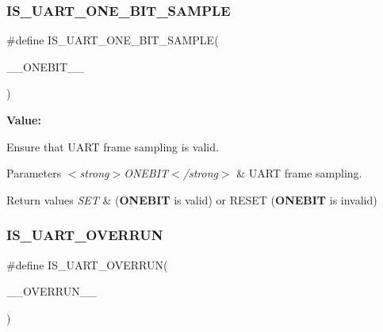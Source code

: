 \subsubsection{\texorpdfstring{IS\_UART\_ONE\_BIT\_SAMPLE}{IS\_UART\_ONE\_BIT\_SAMPLE}}
{\footnotesize\ttfamily \#define I\+S\+\_\+\+U\+A\+R\+T\+\_\+\+O\+N\+E\+\_\+\+B\+I\+T\+\_\+\+S\+A\+M\+P\+LE(\begin{DoxyParamCaption}\item[{}]{\+\_\+\+\_\+\+O\+N\+E\+B\+I\+T\+\_\+\+\_\+ }\end{DoxyParamCaption})}

{\bfseries Value\+:}
\begin{DoxyCode}{0}

\end{DoxyCode}


Ensure that U\+A\+RT frame sampling is valid. 


\begin{DoxyParams}{Parameters}
{\em $<$strong$>$\+O\+N\+E\+B\+I\+T$<$/strong$>$} & U\+A\+RT frame sampling. \\
\hline
\end{DoxyParams}

\begin{DoxyRetVals}{Return values}
{\em S\+ET} & ({\bfseries{O\+N\+E\+B\+IT}} is valid) or R\+E\+S\+ET ({\bfseries{O\+N\+E\+B\+IT}} is invalid) \\
\hline
\end{DoxyRetVals}
\mbox{\label{group___u_a_r_t___private___macros_ga57b4229ecb4387a0bb9137fed8de13b8}} 
\subsubsection{\texorpdfstring{IS\_UART\_OVERRUN}{IS\_UART\_OVERRUN}}
{\footnotesize\ttfamily \#define I\+S\+\_\+\+U\+A\+R\+T\+\_\+\+O\+V\+E\+R\+R\+UN(\begin{DoxyParamCaption}\item[{}]{\+\_\+\+\_\+\+O\+V\+E\+R\+R\+U\+N\+\_\+\+\_\+ }\end{DoxyParamCaption})}

